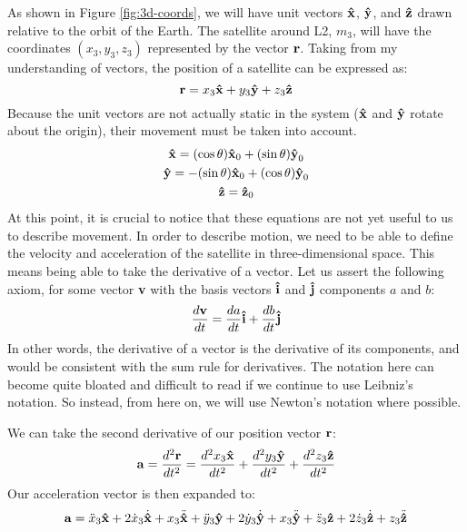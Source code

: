 As shown in Figure \ref{fig:3d-coords}, we will have unit vectors $\uvec{x}$, $\uvec{y}$, and $\uvec{z}$ drawn relative to the orbit of the Earth.
The satellite around L2, $m_3$, will have the coordinates $(x_3,y_3,z_3)$ represented by the vector $\bm{\mathbf{r}}$.
Taking from my understanding of vectors, the position of a satellite can be expressed as:
\begin{equation*}
	\bvec{r} = x_3\uvec{x} + y_3\uvec{y} + z_3\uvec{z}
\end{equation*}
Because the unit vectors are not actually static in the system ($\uvec{x}$ and $\uvec{y}$ rotate about the origin), their movement must be taken into account.
\begin{gather*}
	\uvec{x} = (\cos\theta)\uvec{x}_0 + (\sin\theta)\uvec{y}_0 \\
	\uvec{y} = -(\sin\theta)\uvec{x}_0 + (\cos\theta)\uvec{y}_0 \\
	\uvec{z} = \uvec{z}_0
\end{gather*}
At this point, it is crucial to notice that these equations are not yet useful to us to describe movement.
In order to describe motion, we need to be able to define the velocity and acceleration of the satellite in three-dimensional space.
This means being able to take the derivative of a vector.
Let us assert the following axiom, for some vector \textbf{v} with the basis vectors $\uvec{i}$ and $\uvec{j}$ components $a$ and $b$:
\begin{equation}
	\frac{d\bvec{v}}{dt} = \frac{da}{dt}\uvec{i} + \frac{db}{dt}\uvec{j}
\end{equation}
In other words, the derivative of a vector is the derivative of its components, and would be consistent with the sum rule for derivatives. 
The notation here can become quite bloated and difficult to read if we continue to use Leibniz's notation.
So instead, from here on, we will use Newton's notation where possible.

We can take the second derivative of our position vector $\bm{\mathbf{r}}$:
\begin{equation*}
	\bvec{a} = \frac{d^2\bvec{r}}{dt^2} = \frac{d^2x_3\uvec{x}}{dt^2} + \frac{d^2y_3\uvec{y}}{dt^2} + \frac{d^2z_3\uvec{z}}{dt^2}
\end{equation*}
Our acceleration vector is then expanded to:
\begin{equation*}
	\bvec{a} = \ddot{x}_3\uvec{x} + 2\dot{x}_3\dot{\uvec{x}} + x_3\ddot{\uvec{x}} + \ddot{y}_3\uvec{y} + 2\dot{y}_3\dot{\uvec{y}} + x_3\ddot{\uvec{y}} + \ddot{z}_3\uvec{z} + 2\dot{z}_3\dot{\uvec{z}} + z_3\ddot{\uvec{z}}
\end{equation*}